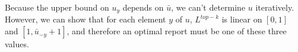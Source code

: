 \documentclass[12pt]{article}
\newcommand{\ubar}{\bar{u}}
\newcommand{\inprod}[2]{\langle #1, #2 \rangle}%
\newcommand{\ones}{\mathbbm{1}}
\begin{document}
%
%
Because the upper bound on $u_y$ depends on $\ubar$, we can't determine $u$ iteratively.
However, we can show that for each element $y$ of $u$, $L^{top-k}$ is linear on $[0,1]$ and $[1, \bar u_{-y} + 1]$, and therefore an optimal report must be one of these three values.
\end{document}
